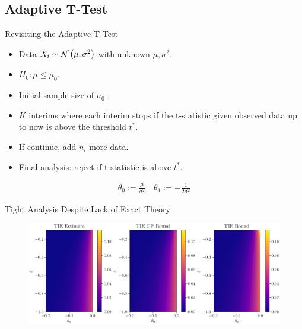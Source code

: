\subsection{Adaptive T-Test}
\frame{\tableofcontents[currentsubsection]}

\begin{frame}{Revisiting the Adaptive T-Test}
\begin{itemize}
    \item Data $X_i \sim \mathcal{N}\left( \mu, \sigma^2 \right)$
        with unknown $\mu, \sigma^2$.
    \item $H_0: \mu \leq \mu_0$.
    \item Initial sample size of $n_0$.
    \item $K$ interims where each interim stops 
        if the t-statistic given observed data up to now
        is above the threshold $t^*$.
    \item If continue, add $n_i$ more data.
    \item Final analysis: reject if t-statistic is above $t^*$.
\end{itemize} 
\begin{align*}
    \theta_0 := \frac{\mu}{\sigma^2}
    \quad
    \theta_1 := -\frac{1}{2\sigma^2}
\end{align*}
\end{frame}

\begin{frame}{Tight Analysis Despite Lack of Exact Theory}
\begin{figure}
    \centering
    \includegraphics[width=\linewidth]{figs/t_test_adaptive.png}
\end{figure} 
\end{frame}


